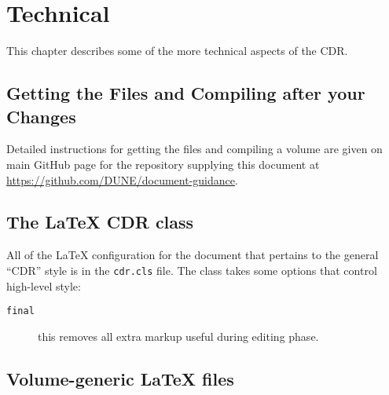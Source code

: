 \chapter{Technical}

This chapter describes some of the more technical aspects of the CDR.

\section{Getting the Files and Compiling after your Changes}
\label{sec:getfiles-compile}

Detailed instructions for getting the files and compiling a volume are
given on main GitHub page for the repository supplying this document at
\url{https://github.com/DUNE/document-guidance}.


\section{The \LaTeX{} CDR class}

All of the \LaTeX{} configuration for the document that pertains to
the general ``CDR'' style is in the
\texttt{cdr.cls} file.
The class takes some options that control high-level style:

\begin{description}
\item[\texttt{final}] this removes all extra markup useful during
  editing phase.
\end{description}

\section{Volume-generic \LaTeX{} files}

